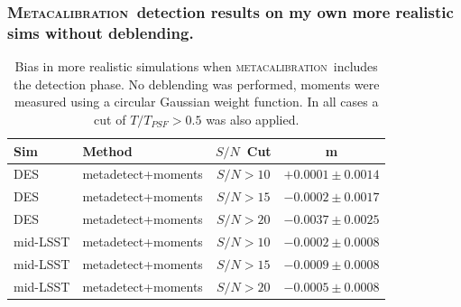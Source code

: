 \documentclass{beamer}
\newcommand{\mcal}{\textsc{metacalibration}}
\newcommand{\Mcal}{\textsc{Metacalibration}}
\newcommand{\snr}{$S/N$}
\begin{document}
\begin{frame}
    \frametitle{\Mcal\ detection results on my own more realistic sims without deblending.}

 
    \begin{table}
        \centering
        \begin{tabular}{|l|l|c|c|}
            \hline
            Sim & Method         & \snr\ Cut & m             \\
            \hline

            \hline
            {\color{green} DES} & metadetect+moments    & \snr$ > 10$ & $+0.0001 \pm 0.0014$  \\
            {\color{green} DES} & metadetect+moments    & \snr$ > 15$ & $-0.0002 \pm 0.0017$  \\
            {\color{green} DES} & metadetect+moments    & \snr$ > 20$ & $-0.0037 \pm 0.0025$  \\
            \hline
            {\color{brightred}mid-LSST}    & metadetect+moments    & \snr$ > 10$ & $-0.0002 \pm 0.0008$  \\
            {\color{brightred}mid-LSST}    & metadetect+moments    & \snr$ > 15$ & $-0.0009 \pm 0.0008$  \\
            {\color{brightred}mid-LSST}    & metadetect+moments    & \snr$ > 20$ & $-0.0005 \pm 0.0008$  \\
            \hline

        \end{tabular}
        \caption{Bias in more realistic simulations when \mcal\ includes
            the detection phase.  No deblending was performed, 
            moments were measured using a circular Gaussian weight function.
            In all cases a cut of $T/T_{PSF} > 0.5$ was also applied.
        \label{tab:mcal:deblending}}
    \end{table}


\end{frame}
\end{document}
